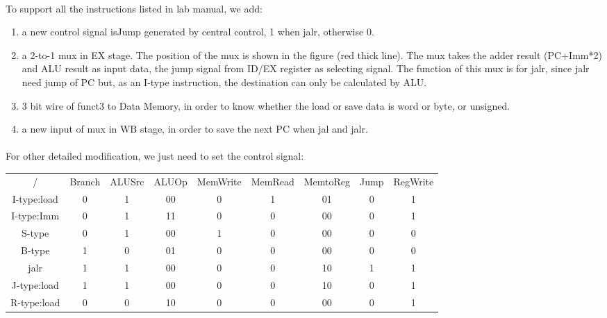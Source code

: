 \documentclass[a4paper]{article}
\begin{document}
\paragraph{}To support all the instructions listed in lab manual, we add:
\begin{enumerate}
    \item a new control signal isJump generated by central control, 1 when jalr, otherwise 0.
    \item a 2-to-1 mux in EX stage. The position of the mux is shown in the figure (red thick line). The mux takes the adder result (PC+Imm*2) and ALU result as input data, the jump signal from ID/EX register as selecting signal. The function of this mux is for jalr, since jalr need jump of PC but, as an I-type instruction, the destination can only be calculated by ALU.
    \item 3 bit wire of funct3 to Data Memory, in order to know whether the load or save data is word or byte, or unsigned.
    \item a new input of mux in WB stage, in order to save the next PC when jal and jalr. 
\end{enumerate}

\paragraph{}For other detailed modification, we just need to set the control signal:\\
\begin{tabular}{|c|c|c|c|c|c|c|c|c|}
/ & Branch & ALUSrc & 
ALUOp & MemWrite & MemRead & MemtoReg & Jump & RegWrite \\
I-type:load & 0 & 1 & 00 & 0 & 1 & 01 & 0 & 1 \\
I-type:Imm & 0 & 1 & 11 & 0 & 0 & 00 & 0 & 1 \\
S-type & 0 & 1 & 00 & 1 & 0 & 00 & 0 & 0 \\
B-type & 1 & 0 & 01 & 0 & 0 & 00 & 0 & 0 \\
jalr & 1 & 1 & 00 & 0 & 0 & 10 & 1 & 1 \\
J-type:load & 1 & 1 & 00 & 0 & 0 & 10 & 0 & 1 \\
R-type:load & 0 & 0 & 10 & 0 & 0 & 00 & 0 & 1 \\
\end{tabular}
\end{document}
